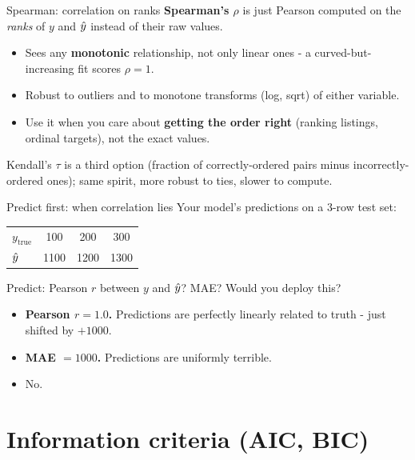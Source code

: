 \documentclass[aspectratio=169]{beamer}
\begin{document}
\begin{frame}{Spearman: correlation on ranks}
  \textbf{Spearman's $\rho$} is just Pearson computed on the \emph{ranks} of $y$ and $\hat{y}$ instead of their raw values.
  \vfill
  \begin{itemize}
    \item Sees any \textbf{monotonic} relationship, not only linear ones - a curved-but-increasing fit scores $\rho = 1$.
    \item Robust to outliers and to monotone transforms (log, sqrt) of either variable.
    \item Use it when you care about \textbf{getting the order right} (ranking listings, ordinal targets), not the exact values.
  \end{itemize}
  \vfill
  \footnotesize Kendall's $\tau$ is a third option (fraction of correctly-ordered pairs minus incorrectly-ordered ones); same spirit, more robust to ties, slower to compute.
\end{frame}

\begin{frame}{Predict first: when correlation lies}
  Your model's predictions on a 3-row test set:
  \vskip 4pt
  \begin{center}\small
    \begin{tabular}{lccc}
      $y_\text{true}$ & 100 & 200 & 300 \\
      $\hat{y}$           & 1100 & 1200 & 1300 \\
    \end{tabular}
  \end{center}
  \vfill
  Predict: Pearson $r$ between $y$ and $\hat{y}$? MAE? Would you deploy this?
  \pause
  \vfill
  \begin{itemize}
    \item \textbf{Pearson $r = 1.0$.} Predictions are perfectly linearly related to truth - just shifted by $+1000$.
    \item \textbf{MAE $= 1000$.} Predictions are uniformly terrible.
    \item No.
  \end{itemize}
  \vfill
\end{frame}

\section{Information criteria (AIC, BIC)}
\end{document}
